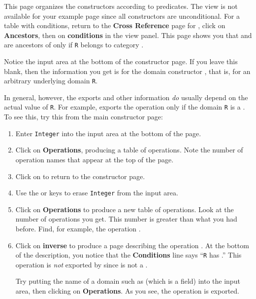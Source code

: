 This page organizes the constructors according to predicates.
The view is not available for your example page since all constructors
are unconditional.
For a table with conditions, return to the {\bf Cross Reference} page
for , click on {\bf Ancestors}, then on {\bf
conditions} in the view panel.
This page shows you that  and
 are ancestors of  only if {\tt R}
belongs to category .


Notice the input area at the bottom of the constructor page.
If you leave this blank, then the information you get is for the
domain constructor , that is,  for an
arbitrary underlying domain {\tt R}.

In general, however, the exports and other information {\it do} usually
depend on the actual value of {\tt R}.
For example,  exports the  operation
only if the domain {\tt R} is a .
To see this, try this from the main constructor page:

\begin{enumerate}
\item Enter {\tt Integer} into the input area at the bottom of the page.

\item Click on {\bf Operations}, producing a table of operations.
Note the number of operation names that appear at the top of the
page.

\item Click on \UpBitmap{} to return to the constructor page.

\item Use the
or
keys to erase {\tt Integer} from the input area.

\item Click on {\bf Operations} to produce a new table of operations.
Look at the number of operations you get.
This number is greater than what you had before.
Find, for example, the operation .

\item Click on {\bf inverse} to produce a page describing the operation
.
At the bottom of the description, you notice that the {\bf
Conditions} line says ``{\tt R} has .''
This operation is {\it not} exported by  since
 is not a .

Try putting the name of a domain such as 
(which is a field) into the input area, then clicking on {\bf Operations}.
As you see, the operation  is exported.
\end{enumerate}

